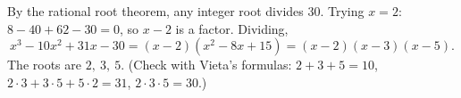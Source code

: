 By the rational root theorem, any integer root divides $30$. Trying $x=2$: $8-40+62-30=0$, so $x-2$ is a factor. Dividing,
\[x^3-10x^2+31x-30=(x-2)\left(x^2-8x+15\right)=(x-2)(x-3)(x-5).\]
The roots are $\boxed{2,\ 3,\ 5}$. (Check with Vieta's formulas: $2+3+5=10$, $2\cdot3+3\cdot5+5\cdot2=31$, $2\cdot3\cdot5=30$.)
